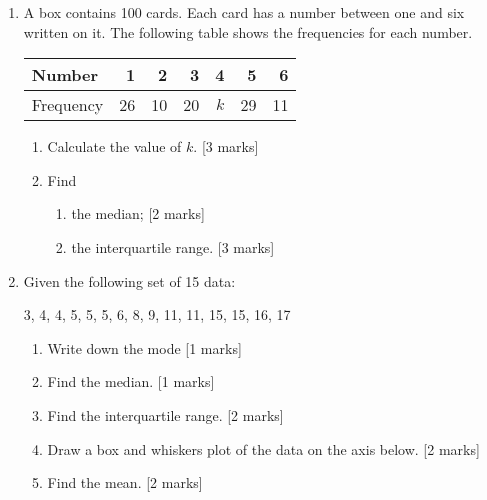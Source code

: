 \documentclass[12pt, twoside]{article}
\begin{document}
\begin{enumerate}
\item A box contains 100 cards. Each card has a number between one and six written on it. The following table shows the frequencies for each number.
\begin{center}
  \begin{tabular}{|l|r|r|r|r|r|r|}
    \hline
    Number & 1 & 2 & 3 & 4 & 5 & 6\\ 
    \hline 
    Frequency & 26 & 10 & 20 & $k$ & 29 & 11\\ 
    \hline 
  \end{tabular}
\end{center}

\begin{enumerate}
  \item Calculate the value of $k$. \hfill [3 marks] \vspace{1.5cm}
  \item Find
  \begin{enumerate}
    \item the median; \hfill [2 marks] \vspace{2cm}
    \item the interquartile range. \hfill [3 marks]
  \end{enumerate}
\end{enumerate}

  \newpage
  \item Given the following set of 15 data:
    \begin{center}
    3, 4, 4, 5, 5, 5, 6, 8, 9, 11, 11, 15, 15, 16, 17
  \end{center}
  \begin{enumerate}
    \item Write down the mode \hfill [1 marks] \vspace{1cm}
    \item Find the median. \hfill [1 marks] \vspace{1.5cm}
    \item Find the interquartile range. \hfill [2 marks] \vspace{3cm}
    \item Draw a box and whiskers plot of the data on the axis below. \hfill [2 marks] \vspace{1cm}
      \begin{center}
      \end{center} \vspace{1cm}
      \item Find the mean. \hfill [2 marks]
    \end{enumerate}


\end{enumerate}
\end{document}
